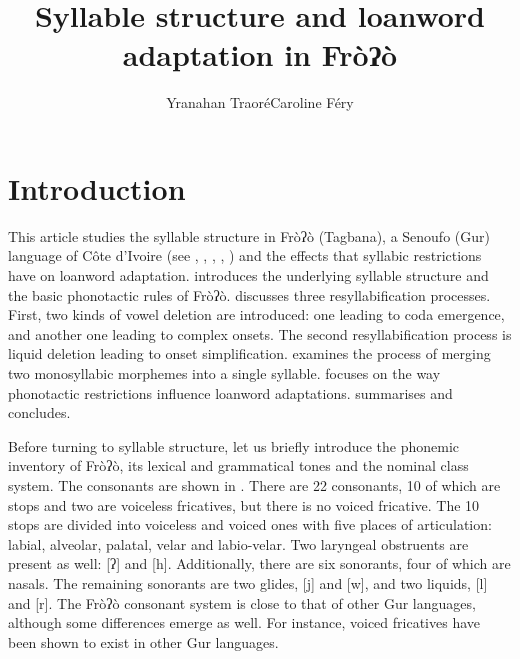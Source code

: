 \documentclass[output=paper]{langscibook}
\author{Yranahan Traoré\lastand Caroline Féry\affiliation{University of Frankfurt}}
\title{Syllable structure and loanword adaptation in Fròʔò}
\begin{document}
\maketitle

\section{Introduction}
\label{sec:traore:introduction:1}

This article studies the syllable structure in Fròʔò (Tagbana), a Senoufo (Gur) language of Côte d’Ivoire (see \citealt{Clamens1952}, \citealt{Manessy1962}, \citealt{Herault1973}, \citealt{Miehe2012}, \citealt{MieheEtAl2012}) and the effects that syllabic restrictions have on loanword adaptation.  introduces the underlying syllable structure and the basic phonotactic rules of Fròʔò.  discusses three resyllabification processes. First, two kinds of vowel deletion are introduced: one leading to coda emergence, and another one leading to complex onsets.  The second resyllabification process is liquid deletion leading to onset simplification.  examines the process of merging two monosyllabic morphemes into a single syllable.  focuses on the way phonotactic restrictions influence loanword adaptations.  summarises and concludes.

Before turning to syllable structure, let us briefly introduce the phonemic inventory of Fròʔò, its lexical and grammatical tones and the nominal class system. The consonants are shown in . 
There are 22 consonants, 10 of which are stops and two are voiceless fricatives, but there is no voiced fricative. The 10 stops are divided into voiceless and voiced ones with five places of articulation: labial, alveolar, palatal, velar and labio-velar. Two laryngeal obstruents are present as well: [ʔ] and [h]. Additionally, there are six sonorants, four of which are nasals. The remaining sonorants are two glides, [j] and [w], and two liquids, [l] and [r]. The Fròʔò consonant system is close to that of other ​​Gur languages, although some differences emerge as well. For instance, voiced fricatives have been shown to exist in other Gur languages.
\end{document}
